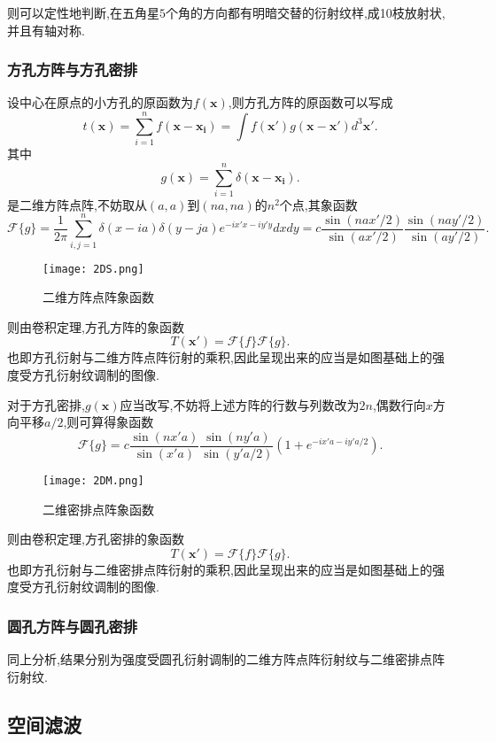 \documentclass[10pt]{ctexart}
\begin{document}
则可以定性地判断,在五角星$5$个角的方向都有明暗交替的衍射纹样,成10枝放射状,并且有轴对称.
\subsubsection{方孔方阵与方孔密排}
设中心在原点的小方孔的原函数为$f(\bm{x})$,则方孔方阵的原函数可以写成
$$t(\bm{x})=\displaystyle\sum_{i=1}^n f(\bm{x}-\bm{x_i})=\int f(\bm{x'})g(\bm{x}-\bm{x'})d^3\bm{x'}.$$
其中
$$g(\bm{x})=\displaystyle\sum_{i=1}^n \delta(\bm{x}-\bm{x_i}).$$
是二维方阵点阵,不妨取从$(a,a)$到$(na,na)$的$n^2$个点,其象函数
$$\mathcal{F}\{g\}=\frac{1}{2\pi}\displaystyle\sum_{i,j=1}^n\delta(x-ia)\delta(y-ja)e^{-ix'x-iy'y}dxdy=c\frac{\sin{(nax'/2)}}{\sin{(ax'/2)}}\frac{\sin{(nay'/2)}}{\sin{(ay'/2)}}.$$
\begin{figure}[H]
\centering
\texttt{[image: 2DS.png]}
\caption{二维方阵点阵象函数}
\end{figure}
则由卷积定理,方孔方阵的象函数
$$T(\bm{x'})=\mathcal{F}\{f\}\mathcal{F}\{g\}.$$
也即方孔衍射与二维方阵点阵衍射的乘积,因此呈现出来的应当是如图基础上的强度受方孔衍射纹调制的图像.

对于方孔密排,$g(\bm{x})$应当改写,不妨将上述方阵的行数与列数改为$2n$,偶数行向$x$方向平移$a/2$,则可算得象函数
$$\mathcal{F}\{g\}=c\frac{\sin{(nx'a)}}{\sin{(x'a)}}\frac{\sin{(ny'a)}}{\sin{(y'a/2)}}(1+e^{-ix'a-iy'a/2}).$$
\begin{figure}[H]
\centering
\texttt{[image: 2DM.png]}
\caption{二维密排点阵象函数}
\end{figure}
则由卷积定理,方孔密排的象函数
$$T(\bm{x'})=\mathcal{F}\{f\}\mathcal{F}\{g\}.$$
也即方孔衍射与二维密排点阵衍射的乘积,因此呈现出来的应当是如图基础上的强度受方孔衍射纹调制的图像.
\subsubsection{圆孔方阵与圆孔密排}
同上分析,结果分别为强度受圆孔衍射调制的二维方阵点阵衍射纹与二维密排点阵衍射纹.

\subsection{空间滤波}
\end{document}
